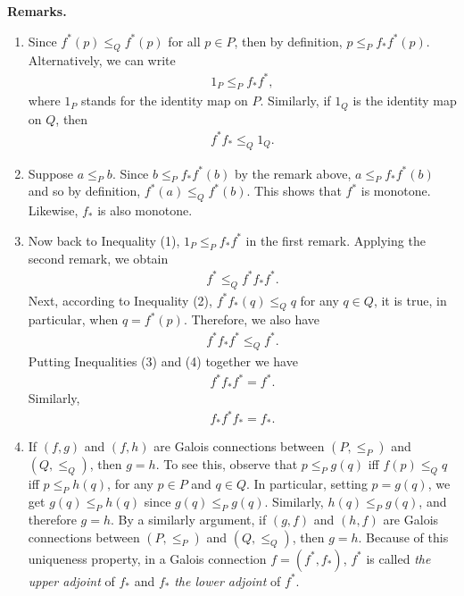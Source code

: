 \documentclass[12pt]{article}
\begin{document}
\textbf{Remarks.}
\begin{enumerate}
\item Since $f^*(p)\leq_Q f^*(p)$ for all $p\in P$, then by definition, $p\leq_P f_*f^*(p)$.  Alternatively, we can write \begin{eqnarray}1_P\leq_P f_*f^*, \end{eqnarray} where $1_P$ stands for the identity map on $P$. Similarly, if $1_Q$ is the identity map on $Q$, then \begin{eqnarray}f^*f_*\leq_Q 1_Q. \end{eqnarray}
\item Suppose $a\leq_P b$.  Since $b\leq_P f_*f^*(b)$ by the remark above, $a\leq_P f_*f^*(b)$ and so by definition, $f^*(a)\leq_Q f^*(b)$. This shows that $f^*$ is monotone.  Likewise, $f_*$ is also monotone.
\item Now back to Inequality (1), $1_P\leq_P f_*f^*$ in the first remark.  Applying the second remark, we obtain
\begin{eqnarray}f^*\leq_Q f^*f_*f^*. \end{eqnarray} Next, according to Inequality (2), $f^*f_*(q)\leq_Q q$ for any $q\in Q$, it is true, in particular, when $q=f^*(p)$. Therefore, we also have
\begin{eqnarray}f^*f_*f^*\leq_Q f^*.\end{eqnarray}  Putting Inequalities (3) and (4) together we have
\begin{eqnarray}f^*f_*f^*=f^*.\end{eqnarray}  Similarly, \begin{eqnarray}f_*f^*f_*=f_*.\end{eqnarray}
\item If $(f,g)$ and $(f,h)$ are Galois connections between $(P,\le_P)$ and $(Q,\le_Q)$, then $g=h$.  To see this, observe that $p\le_P g(q)$ iff $f(p)\le_Q q$ iff $p \le_P h(q)$, for any $p\in P$ and $q\in Q$.  In particular, setting $p=g(q)$, we get $g(q)\le_P h(q)$ since $g(q)\le_P g(q)$.  Similarly, $h(q)\le_P g(q)$, and therefore $g=h$.  By a similarly argument, if $(g,f)$ and $(h,f)$ are Galois connections between $(P,\le_P)$ and $(Q,\le_Q)$, then $g=h$.  Because of this uniqueness property, in a Galois connection $f=(f^*,f_*)$, $f^*$ is called \emph{the upper adjoint} of $f_*$ and $f_*$ \emph{the lower adjoint} of $f^*$.
\end{enumerate}
\end{document}
